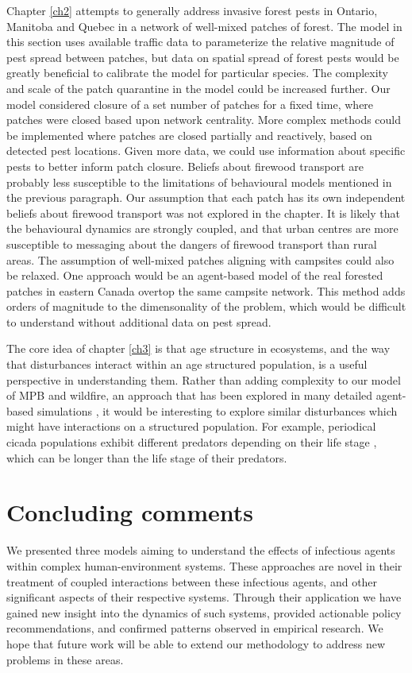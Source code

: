 Chapter \ref{ch2} attempts to generally address invasive forest pests in Ontario, Manitoba and Quebec in a network of well-mixed patches of forest. The model in this section uses available traffic data to parameterize the relative magnitude of pest spread between patches, but data on spatial spread of forest pests would be greatly beneficial to calibrate the model for particular species. The complexity and scale of the patch quarantine in the model could be increased further. Our model considered closure of a set number of patches for a fixed time, where patches were closed based upon network centrality. More complex methods could be implemented where patches are closed partially and reactively, based on detected pest locations. Given more data, we could use information about specific pests to better inform patch closure. Beliefs about firewood transport are probably less susceptible to the limitations  of behavioural models mentioned in the previous paragraph. Our assumption that each patch has its own independent beliefs about firewood transport was not explored in the chapter. It is likely that the behavioural dynamics are strongly coupled, and that urban centres are more susceptible to messaging about the dangers of firewood transport than rural areas. The assumption of well-mixed patches aligning with campsites could also be relaxed. One approach would be an agent-based model of the real forested patches in eastern Canada overtop the same campsite network. This method adds orders of magnitude to the dimensonality of the problem, which would be difficult to understand without additional data on pest spread.  

The core idea of chapter \ref{ch3} is that age structure in ecosystems, and the way that disturbances interact within an age structured population, is a useful perspective in understanding them. Rather than adding complexity to our model of MPB and wildfire, an approach that has been explored in many detailed agent-based simulations \cite{caldwell2013simulated,perrakis2014modeling,ager2007modeling,loehman2017interactions}, it would be interesting to explore similar disturbances which might have interactions on a structured population. For example, periodical cicada populations exhibit different predators depending on their life stage \cite{lloyd1966periodical}, which can be longer than the life stage of their predators. 

\section{Concluding comments}

We presented three models aiming to understand the effects of infectious agents within complex human-environment systems. These approaches are novel in their treatment of coupled interactions between these infectious agents, and other significant aspects of their respective systems. Through their application we have gained new insight into the dynamics of such systems, provided actionable policy recommendations, and confirmed patterns observed in empirical research. We hope that future work will be able to extend our methodology to address new problems in these areas.